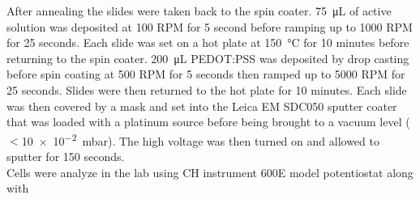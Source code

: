 	After annealing the slides were taken back to the spin coater. \SI{75}{\micro\liter} of active solution was deposited at 100 RPM for 5 second before ramping up to 1000 RPM for 25 seconds. Each slide was set on a hot plate at \SI{150}{\celsius} for 10 minutes before returning to the spin coater. \SI{200}{\micro\liter} PEDOT:PSS was deposited by drop casting before spin coating at 500 RPM for 5 seconds then ramped up to 5000 RPM for 25 seconds. Slides were then returned to the hot plate for 10 minutes. Each slide was then covered by a mask and set into the Leica EM SDC050 sputter coater that was loaded with a platinum source before being brought to a vacuum level ($<$\SI{10e-2}{\milli\bar}). The high voltage was then turned on and allowed to sputter for 150 seconds. \\
	
	Cells were analyze in the lab using CH instrument 600E model potentiostat along with 
